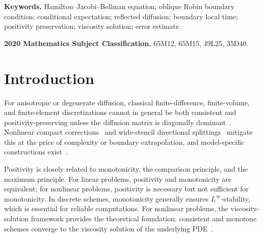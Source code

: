 \documentclass[11pt]{article}
\theoremstyle{definition}
\theoremstyle{remark}
\newcommand{\cO}{\mathcal{O}}
\newcommand{\dt}{\Delta t}
\begin{document}
\begin{abstract}
	
Under $\dt,h\to0$ with $h^2/\dt\to0$ we prove consistency, uniform
stability, and convergence to the viscosity solution via half-relaxed limits.
For a classical solution $u\in C_b^3(\mathcal N_T)$ whose control-resolved
boundary residuals $q_b:=\mathcal L(t,\cdot,Du,u,b)$ are uniformly $C^{1,1}$
on $\partial\cO$, a three-term error decomposition and backward recursion give
$\max|U_i^n-u(t_n,x_i)|\le C(\dt^{1/2}+h^2/\dt)$.  The two terms are balanced
by $\dt\asymp h^{4/3}$, yielding $O(h^{2/3})$, whereas $\dt\asymp h$ gives
$O(h^{1/2})$.  Four two-dimensional studies show monotone error decay over
the reported refinements.  An angular-control sensitivity study is consistent
with the $O(K^{-2})$ directional defect.  In the smooth variable-Robin test,
the balanced schedule $\dt\propto h_{\rm real}^{4/3}$ gives final observed
orders $1.242$--$1.261$ over the displayed refinements, sharper than the
conservative $O(h^{2/3})$ bound.  Nonsmooth conical and mixed
Robin--Dirichlet examples are reported only as stress tests.

\end{abstract}

	
	\noindent\textbf{Keywords.} Hamilton--Jacobi--Bellman equation; oblique Robin boundary condition; conditional expectation; reflected diffusion; boundary local time; positivity preservation; viscosity solution; error estimate.
	
	\medskip
	\noindent\textbf{2020 Mathematics Subject Classification.} 65M12, 65M15, 49L25, 35D40.
	
\section{Introduction}

For anisotropic or degenerate diffusion, classical finite-difference,
finite-volume, and finite-element discretizations cannot in general be both
consistent and positivity-preserving unless the diffusion matrix is
diagonally dominant~\cite{MotzkinWasow1952,CrandallLions1996,NordbottenEtAl2007,SharmaHammett2007}.
Nonlinear compact corrections~\cite{GaoWu2015,KuzminShashkovSvyatskiy2009,LiEtAl2022,SharmaHammett2007,ZhangSuWu2017,ShengYuan2008,YuanSheng2007,YuanSheng2008}
and wide-stencil directional splittings~\cite{BonnansZidani2003,DebrabantJakobsen2013}
mitigate this at the price of complexity or boundary extrapolation, and
model-specific constructions exist~\cite{MaForsyth2017,XuChenLiuYue2019}.

Positivity is closely related to monotonicity, the comparison principle, and
the maximum principle.  For linear problems, positivity and monotonicity are
equivalent; for nonlinear problems, positivity is necessary but not
sufficient for monotonicity.  In discrete schemes, monotonicity generally
ensures $L^\infty$-stability, which is essential for reliable computations.
For nonlinear problems, the viscosity-solution framework provides the
theoretical foundation: consistent and monotone schemes converge to the
viscosity solution of the underlying PDE~\cite{BarlesSouganidis1991}.
\end{document}

